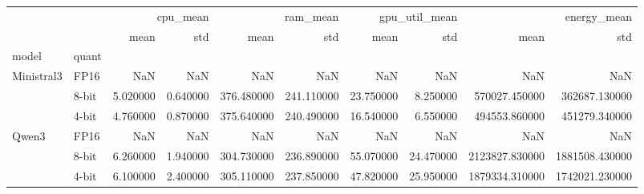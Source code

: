 \begin{tabular}{llrrrrrrrr}
\toprule
 &  & \multicolumn{2}{r}{cpu_mean} & \multicolumn{2}{r}{ram_mean} & \multicolumn{2}{r}{gpu_util_mean} & \multicolumn{2}{r}{energy_mean} \\
 &  & mean & std & mean & std & mean & std & mean & std \\
model & quant &  &  &  &  &  &  &  &  \\
\midrule
\multirow[t]{3}{*}{Ministral3} & FP16 & NaN & NaN & NaN & NaN & NaN & NaN & NaN & NaN \\
 & 8-bit & 5.020000 & 0.640000 & 376.480000 & 241.110000 & 23.750000 & 8.250000 & 570027.450000 & 362687.130000 \\
 & 4-bit & 4.760000 & 0.870000 & 375.640000 & 240.490000 & 16.540000 & 6.550000 & 494553.860000 & 451279.340000 \\
\cline{1-10}
\multirow[t]{3}{*}{Qwen3} & FP16 & NaN & NaN & NaN & NaN & NaN & NaN & NaN & NaN \\
 & 8-bit & 6.260000 & 1.940000 & 304.730000 & 236.890000 & 55.070000 & 24.470000 & 2123827.830000 & 1881508.430000 \\
 & 4-bit & 6.100000 & 2.400000 & 305.110000 & 237.850000 & 47.820000 & 25.950000 & 1879334.310000 & 1742021.230000 \\
\cline{1-10}
\bottomrule
\end{tabular}
